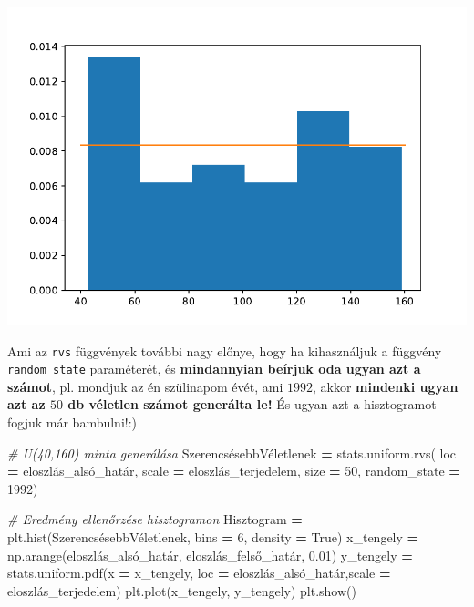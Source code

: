 \documentclass[
]{book}
\newenvironment{Shaded}{\begin{snugshade}}{\end{snugshade}}
\newcommand{\CommentTok}[1]{\textcolor[rgb]{0.56,0.35,0.01}{\textit{#1}}}
\newcommand{\DecValTok}[1]{\textcolor[rgb]{0.00,0.00,0.81}{#1}}
\newcommand{\FloatTok}[1]{\textcolor[rgb]{0.00,0.00,0.81}{#1}}
\newcommand{\NormalTok}[1]{#1}
\newcommand{\OperatorTok}[1]{\textcolor[rgb]{0.81,0.36,0.00}{\textbf{#1}}}
\newcommand{\VariableTok}[1]{\textcolor[rgb]{0.00,0.00,0.00}{#1}}
\begin{document}
\includegraphics{_main_files/figure-latex/unnamed-chunk-209-11.pdf}

Ami az \texttt{rvs} függvények további nagy előnye, hogy ha kihasználjuk a függvény \texttt{random\_state} paraméterét, és \textbf{mindannyian beírjuk oda ugyan azt a számot}, pl. mondjuk az én szülinapom évét, ami \(1992\), akkor \textbf{mindenki ugyan azt az \(50\) db véletlen számot generálta le!} És ugyan azt a hisztogramot fogjuk már bambulni!:)

\begin{Shaded}
\begin{Highlighting}[]
\CommentTok{\# U(40,160) minta generálása}
\NormalTok{SzerencsésebbVéletlenek }\OperatorTok{=}\NormalTok{ stats.uniform.rvs(}
\NormalTok{  loc }\OperatorTok{=}\NormalTok{ eloszlás\_alsó\_határ,}
\NormalTok{  scale }\OperatorTok{=}\NormalTok{ eloszlás\_terjedelem,}
\NormalTok{  size }\OperatorTok{=} \DecValTok{50}\NormalTok{,}
\NormalTok{  random\_state }\OperatorTok{=} \DecValTok{1992}\NormalTok{)}

\CommentTok{\# Eredmény ellenőrzése hisztogramon}
\NormalTok{Hisztogram }\OperatorTok{=}\NormalTok{ plt.hist(SzerencsésebbVéletlenek, bins }\OperatorTok{=} \DecValTok{6}\NormalTok{, density }\OperatorTok{=} \VariableTok{True}\NormalTok{)}
\NormalTok{x\_tengely }\OperatorTok{=}\NormalTok{ np.arange(eloszlás\_alsó\_határ, eloszlás\_felső\_határ, }\FloatTok{0.01}\NormalTok{)}
\NormalTok{y\_tengely }\OperatorTok{=}\NormalTok{ stats.uniform.pdf(x }\OperatorTok{=}\NormalTok{ x\_tengely, loc }\OperatorTok{=}\NormalTok{ eloszlás\_alsó\_határ,scale }\OperatorTok{=}\NormalTok{ eloszlás\_terjedelem)}
\NormalTok{plt.plot(x\_tengely, y\_tengely)}
\NormalTok{plt.show()}
\end{Highlighting}
\end{Shaded}
\end{document}
